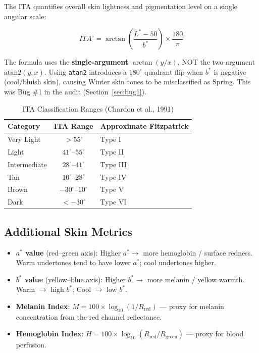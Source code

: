 \documentclass[12pt,a4paper]{article}
\begin{document}
The ITA\textdegree{} quantifies overall skin lightness and pigmentation level on a single angular scale:

\begin{equation}
\boxed{ITA^{\circ} = \arctan\!\left(\frac{L^* - 50}{b^*}\right) \times \frac{180}{\pi}}
\label{eq:ita_correct}
\end{equation}

\begin{dangerblock}
The formula uses the \textbf{single-argument} $\arctan(y/x)$, NOT the two-argument $\text{atan2}(y, x)$. Using \texttt{atan2} introduces a $180^{\circ}$ quadrant flip when $b^*$ is negative (cool/bluish skin), causing Winter skin tones to be misclassified as Spring. This was Bug \#1 in the audit (Section~\ref{sec:bug1}).
\end{dangerblock}

\begin{table}[H]
\centering
\caption{ITA\textdegree{} Classification Ranges (Chardon et al., 1991)}
\begin{tabular}{@{}l c l@{}}
\toprule
\textbf{Category} & \textbf{ITA\textdegree{} Range} & \textbf{Approximate Fitzpatrick} \\
\midrule
Very Light & $> 55^{\circ}$ & Type I \\
Light & $41^{\circ}$--$55^{\circ}$ & Type II \\
Intermediate & $28^{\circ}$--$41^{\circ}$ & Type III \\
Tan & $10^{\circ}$--$28^{\circ}$ & Type IV \\
Brown & $-30^{\circ}$--$10^{\circ}$ & Type V \\
Dark & $< -30^{\circ}$ & Type VI \\
\bottomrule
\end{tabular}
\end{table}

\subsection{Additional Skin Metrics}

\begin{itemize}
    \item \textbf{$a^*$ value} (red--green axis): Higher $a^* \to$ more hemoglobin / surface redness. Warm undertones tend to have lower $a^*$; cool undertones higher.
    \item \textbf{$b^*$ value} (yellow--blue axis): Higher $b^* \to$ more melanin / yellow warmth. Warm $\to$ high $b^*$; Cool $\to$ low $b^*$.
    \item \textbf{Melanin Index}: $M = 100 \times \log_{10}(1 / R_{\text{red}})$ --- proxy for melanin concentration from the red channel reflectance.
    \item \textbf{Hemoglobin Index}: $H = 100 \times \log_{10}(R_{\text{red}} / R_{\text{green}})$ --- proxy for blood perfusion.
\end{itemize}
\end{document}
